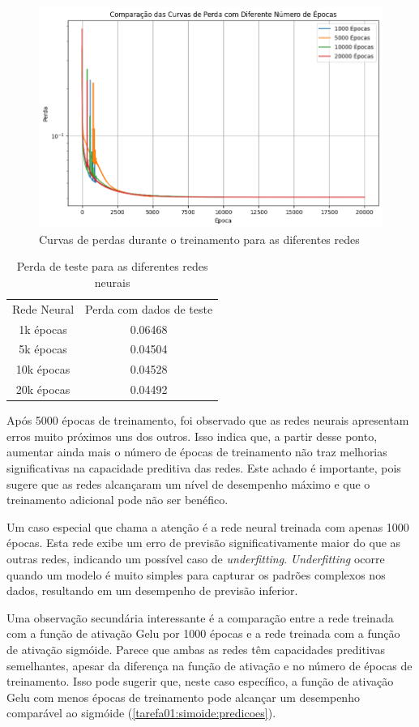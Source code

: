 \begin{figure}
	\centering
	\caption{Curvas de perdas durante o treinamento para as diferentes 
	redes}\label{tarefa02:figura:curvas}
	\includegraphics[width=0.7\linewidth]{./0803_imgs/png-241110-160937603-16503693892993531452.png}
\end{figure}

\begin{table}[htb]
	\caption{Perda de teste para as diferentes redes neurais}
	\centering
	\label{tarefa02:tabela:perdas}
\begin{tabular}{c | c}
	Rede Neural & Perda com dados de teste \\
	1k épocas  &  0.06468 \\
	5k épocas  &  0.04504 \\
	10k épocas &  0.04528 \\
	20k épocas &  0.04492
\end{tabular}
\end{table}

Após 5000 épocas de treinamento, foi observado que as redes neurais apresentam 
erros muito próximos uns dos outros. Isso indica que, a partir desse ponto, 
aumentar ainda mais o número de épocas de treinamento não traz melhorias 
significativas na capacidade preditiva das redes. Este achado é importante, 
pois sugere que as redes alcançaram um nível de desempenho máximo e que o 
treinamento adicional pode não ser benéfico.

Um caso especial que chama a atenção é a rede neural treinada com apenas 1000 
épocas. Esta rede exibe um erro de previsão significativamente maior do que as 
outras redes, indicando um possível caso de \textit{underfitting}. 
\textit{Underfitting}
ocorre 
quando 
um modelo é muito simples para capturar os padrões complexos nos dados, 
resultando em um desempenho de previsão inferior.

Uma observação secundária interessante é a comparação entre a rede treinada com 
a função de ativação Gelu por 1000 épocas e a rede treinada com a função de 
ativação sigmóide. Parece que ambas as redes têm capacidades preditivas 
semelhantes, apesar da diferença na função de ativação e no número de épocas de 
treinamento. Isso pode sugerir que, neste caso específico, a função de ativação 
Gelu com menos épocas de treinamento pode alcançar um desempenho comparável ao 
sigmóide (\cref{tarefa01:simoide:predicoes}).

